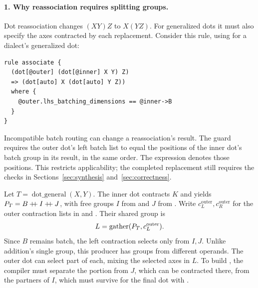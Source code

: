 \paragraph{1. Why reassociation requires splitting groups.}
Dot reassociation changes $(XY)Z$ to $X(YZ)$. For generalized dots it must also
specify the axes contracted by each replacement. Consider this rule, using
 for a dialect's generalized dot:
\begin{codeblock}[H]
\begin{lstlisting}[language=TEPL]
rule associate {
  (dot[@outer] (dot[@inner] X Y) Z)
  => (dot[auto] X (dot[auto] Y Z))
  where {
    @outer.lhs_batching_dimensions == @inner->B
  }
}
\end{lstlisting}
\end{codeblock}
Incompatible batch routing can change a reassociation's result. The guard
requires the outer dot's left batch list to equal the positions of the inner
dot's batch group in its result, in the same order. The expression
 denotes those positions. This restricts applicability;
the completed replacement still requires the checks in
Sections~\ref{sec:synthesis} and~\ref{sec:correctness}.

Let $T=\operatorname{dot\_general}(X,Y)$. The inner dot contracts $K$ and
yields $P_T=B\mathbin{+\!\!+} I\mathbin{+\!\!+} J$, with free groups $I$ from  and
$J$ from . Write $c_L^{\mathrm{outer}},c_R^{\mathrm{outer}}$ for the
outer contraction lists in  and . Their shared group is
\begin{equation}
 L=\operatorname{gather}(P_T,c_L^{\mathrm{outer}}).
\end{equation}
Since $B$ remains batch, the left contraction selects only from $I,J$.
Unlike addition's single group, this producer has groups from different
operands. The outer dot can select part of each, mixing the selected axes
in $L$. To build , the compiler must separate the
portion from $J$, which can be contracted there, from the partners of $I$,
which must survive for the final dot with .

